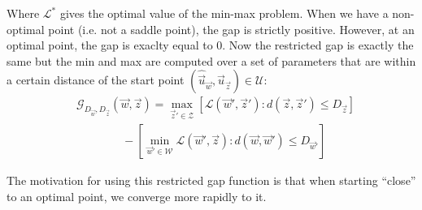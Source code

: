 \documentclass{article}
\begin{document}
Where $\mathcal{L}^*$ gives the optimal value of the min-max problem. When we have a non-optimal point (i.e. not a saddle point), the gap is strictly positive. However, at an optimal point, the gap is exaclty equal to $0$.
Now the restricted gap is exactly the same but the min and max are computed over a set of parameters that are within a certain distance of the start point
$(\hat{\vec u}_{\vec w},\hat{\vec u}_{\vec z}) \in \mathcal{U}$:
\begin{equation}
\begin{aligned}
    &\mathcal{G}_{D_{\vec w}, D_{\vec z}}(\vec w, \vec z) = \max_{\vec z' \in \mathcal{Z}} \left[ \mathcal{L}(\vec w', \vec z') : d(\vec z, \vec z') \leq D_{\vec z} \right]\\
    &\quad\quad\quad\quad-\left [ \min_{\vec w' \in \mathcal{W}} \mathcal{L}(\vec w',\vec z) : d(\vec w, \vec w') \leq D_{\vec w'} \right ]
\end{aligned}
\end{equation}

The motivation for using this restricted gap function is that when starting ``close'' to an optimal point, we converge more rapidly to it.
\end{document}

